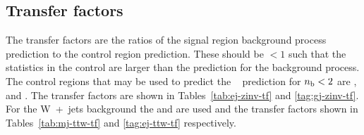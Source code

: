 \begin{table}[h]
\begin{tabular}
  \end{tabular}
\end{table}

\subsection{Transfer factors}

The transfer factors are the ratios of the signal region background process
prediction to the control region prediction. These should be $\lt 1$ such that 
the statistics in the control are larger than the prediction for the background
process. The control regions that may be used to predict the \zInv~ prediction for $n_{\text{b}} < 2$ are
\mj, \ej and \gj. The transfer factors are shown in Tables~\ref{tab:ej-zinv-tf} and \ref{tag:gj-zinv-tf}. 
For the W~+~jets background the \mj and \ej are used and the transfer factors shown in 
Tables~\ref{tab:mj-ttw-tf} and \ref{tag:ej-ttw-tf} respectively.

